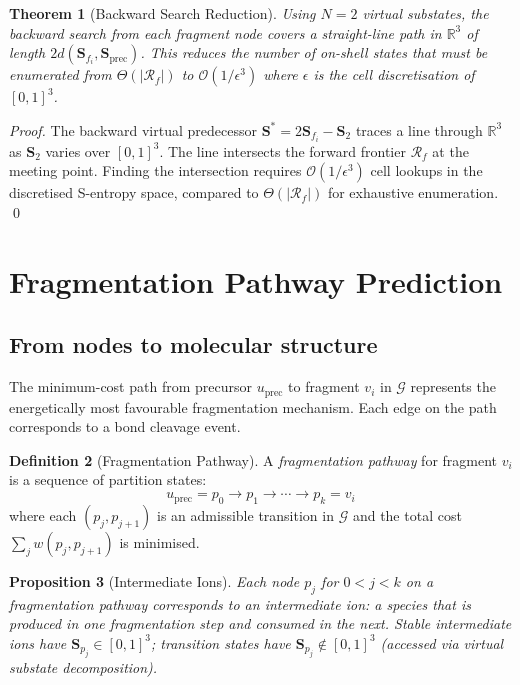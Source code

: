 \documentclass[twocolumn,10pt,a4paper]{article}
\theoremstyle{thmstyle}
\newtheorem{theorem}{Theorem}[section]
\newtheorem{proposition}[theorem]{Proposition}
\theoremstyle{definition}
\newtheorem{definition}[theorem]{Definition}
\theoremstyle{remark}
\newcommand{\R}{\mathbb{R}}
\newcommand{\Sv}{\mathbf{S}}
\newcommand{\calG}{\mathcal{G}}
\newcommand{\Reachf}{\mathcal{R}_f}
\begin{document}
\begin{theorem}[Backward Search Reduction]
\label{thm:backward-reduction}
Using $N = 2$ virtual substates, the backward search from each fragment
node covers a straight-line path in $\R^3$ of length $2d(\Sv_{f_i},
\Sv_\text{prec})$. This reduces the number of on-shell states that must
be enumerated from $\Theta(|\Reachf|)$ to $\mathcal{O}(1/\epsilon^3)$
where $\epsilon$ is the cell discretisation of $[0,1]^3$.
\end{theorem}

\begin{proof}
The backward virtual predecessor $\Sv^* = 2\Sv_{f_i} - \Sv_2$ traces
a line through $\R^3$ as $\Sv_2$ varies over $[0,1]^3$. The line
intersects the forward frontier $\Reachf$ at the meeting point. Finding
the intersection requires $\mathcal{O}(1/\epsilon^3)$ cell lookups in
the discretised S-entropy space, compared to $\Theta(|\Reachf|)$
for exhaustive enumeration. \qed
\end{proof}

\section{Fragmentation Pathway Prediction}
\label{sec:prediction}

\subsection{From nodes to molecular structure}

The minimum-cost path from precursor $u_\text{prec}$ to fragment $v_i$
in $\calG$ represents the energetically most favourable fragmentation
mechanism. Each edge on the path corresponds to a bond cleavage event.

\begin{definition}[Fragmentation Pathway]
\label{def:pathway}
A \emph{fragmentation pathway} for fragment $v_i$ is a sequence of
partition states:
\begin{equation}
u_\text{prec} = p_0 \to p_1 \to \cdots \to p_k = v_i
\end{equation}
where each $(p_j, p_{j+1})$ is an admissible transition in $\calG$
and the total cost $\sum_j w(p_j, p_{j+1})$ is minimised.
\end{definition}

\begin{proposition}[Intermediate Ions]
\label{prop:intermediate}
Each node $p_j$ for $0 < j < k$ on a fragmentation pathway corresponds
to an intermediate ion: a species that is produced in one fragmentation
step and consumed in the next. Stable intermediate ions have
$\Sv_{p_j} \in [0,1]^3$; transition states have
$\Sv_{p_j} \notin [0,1]^3$ (accessed via virtual substate decomposition).
\end{proposition}
\end{document}
